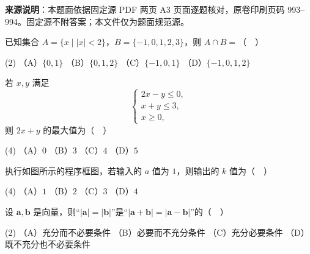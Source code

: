 


\begin{gktip}
\textbf{来源说明}：本题面依据固定源 PDF 两页 A3 页面逐题核对，原卷印刷页码 993–994。固定源不附答案；本文件仅为题面规范源。
\end{gktip}


\begin{question}
已知集合 \(A=\{x\mid |x|<2\}\)，\(B=\{-1,0,1,2,3\}\)，则 \(A\cap B=\)（　）

\begin{gkopts}(2)
\task （A）\(\{0,1\}\)
\task （B）\(\{0,1,2\}\)
\task （C）\(\{-1,0,1\}\)
\task （D）\(\{-1,0,1,2\}\)
\end{gkopts}

\end{question}
\begin{question}
若 \(x,y\) 满足
\nopagebreak[4]
\[
\begin{cases}
2x-y\leqslant 0,\\
x+y\leqslant 3,\\
x\geqslant 0,
\end{cases}
\]
则 \(2x+y\) 的最大值为（　）

\begin{gkopts}(4)
\task （A）\(0\)
\task （B）\(3\)
\task （C）\(4\)
\task （D）\(5\)
\end{gkopts}

\Needspace{0.4\textheight}
\end{question}
\begin{question}
执行如图所示的程序框图，若输入的 \(a\) 值为 \(1\)，则输出的 \(k\) 值为（　）
\nopagebreak[4]
\begin{center}\end{center}
\nopagebreak[4]
\begin{gkopts}(4)
\task （A）\(1\)
\task （B）\(2\)
\task （C）\(3\)
\task （D）\(4\)
\end{gkopts}

\end{question}
\begin{question}
设 \(\boldsymbol{a},\boldsymbol{b}\) 是向量，则“\(|\boldsymbol{a}|=|\boldsymbol{b}|\)”是“\(|\boldsymbol{a}+\boldsymbol{b}|=|\boldsymbol{a}-\boldsymbol{b}|\)”的（　）

\begin{gkopts}(2)
\task （A）充分而不必要条件
\task （B）必要而不充分条件
\task （C）充分必要条件
\task （D）既不充分也不必要条件
\end{gkopts}

\end{question}

